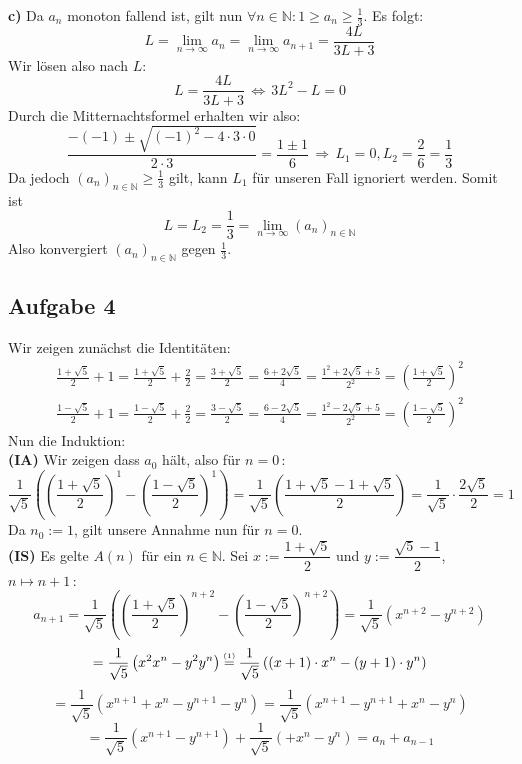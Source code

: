 \documentclass[a4paper,graphics,11pt]{article}
\newcommand{\aufgabe}[1]{\subsection*{Aufgabe #1}}
\newcommand{\up}[2]{\mathrel{\overset{\makebox[0pt]{\mbox{\normalfont\tiny #2}}}{#1}}}
\begin{document}
\textbf{c)} 
Da $a_n$ monoton fallend ist, gilt nun $\forall n \in \mathbb{N} \colon 1\geq a_n \geq \frac{1}{3}$. Es folgt:
$$
 L = \lim_{n \to \infty}\limits a_n = \lim_{n \to \infty} a_{n+1} = \frac{4L}{3L+3}
$$
Wir lösen also nach $L$:
$$
    L = \frac{4L}{3L+3} \,\Longleftrightarrow\, 3L^2-L = 0
$$
Durch die Mitternachtsformel erhalten wir also:
$$
    \frac{-(-1)\pm\sqrt{(-1)^2-4\cdot3\cdot0}}{2\cdot 3} = \frac{1\pm1}{6}
    \,\Longrightarrow\, L_1 = 0, L_2 = \frac{2}{6} = \frac{1}{3}
$$
Da jedoch $(a_n)_{n\in \mathbb{N}} \geq \frac{1}{3}$ gilt, kann $L_1$ für unseren Fall ignoriert
werden. Somit ist
$$
    L=L_2 = \frac{1}{3} = \lim_{n \to \infty} (a_n)_{n \in \mathbb{N}}
$$
Also konvergiert $(a_n)_{n\in \mathbb{N}}$ gegen $\frac{1}{3}$.

\newpage
\aufgabe{4}
Wir zeigen zunächst die Identitäten:\\[5pt]
\begin{equation}
\begin{aligned}
   \frac{1+\sqrt{5}}{2} +1 = \frac{1 +\sqrt{5}}{2} + \frac{2}{2} = \frac{3+\sqrt{5}}{2}
   = \frac{6+2\sqrt{5}}{4} = \frac{1^2+2\sqrt{5}+5}{2^2} = \left(\frac{1+\sqrt{5}}{2}\right)^2\\
    \frac{1-\sqrt{5}}{2} +1 = \frac{1 -\sqrt{5}}{2} + \frac{2}{2} = \frac{3-\sqrt{5}}{2}
   = \frac{6-2\sqrt{5}}{4} = \frac{1^2-2\sqrt{5}+5}{2^2} = \left(\frac{1-\sqrt{5}}{2}\right)^2
\end{aligned}
\end{equation}
Nun die Induktion:\\
\textbf{(IA)} Wir zeigen dass $a_0$ hält, also für $n=0$\,:
$$
    \frac{1}{\sqrt{5}}\left(\left(\frac{1+\sqrt{5}}{2}\right)^1-\left(\frac{1-\sqrt{5}}{2}\right)^1\right)
    = \frac{1}{\sqrt{5}}\left(\frac{1+\sqrt{5} - 1 + \sqrt{5}}{2}\right)
    = \frac{1}{\sqrt{5}} \cdot \frac{2\sqrt{5}}{2} = 1
$$
Da $n_0 := 1$, gilt unsere Annahme nun für $n = 0$.\\[5pt]
\textbf{(IS)} Es gelte $A(n)$ für ein $n \in \mathbb{N}$. 
Sei $x := \dfrac{1+\sqrt{5}}{2}$ und $y:= \dfrac{\sqrt{5}-1}{2}$, $n\mapsto n+1$\,:
$$
    a_{n+1} = \frac{1}{\sqrt{5}}\left(\left(\frac{1+\sqrt{5}}{2}\right)^{n+2}-\left(\frac{1-\sqrt{5}}{2}\right)^{n+2}\right)
    = \frac{1}{\sqrt{5}} \left(x^{n+2} - y^{n+2}\right)
$$$$
    = \frac{1}{\sqrt{5}} \left(x^2x^n - y^2y^n\right)
    \up{=}{(1)} \frac{1}{\sqrt{5}} \left(\left(x+1\right)\cdot x^n - \left(y+1\right)\cdot y^n\right)
$$$$
    = \frac{1}{\sqrt{5}} (x^{n+1}+x^n - y^{n+1}-y^n)
    = \frac{1}{\sqrt{5}} (x^{n+1}-y^{n+1}+x^n-y^n)
$$$$
    = \frac{1}{\sqrt{5}} (x^{n+1}-y^{n+1}) + \frac{1}{\sqrt{5}}(+x^n-y^n)
    = a_{n} + a_{n-1}
$$
\end{document}
